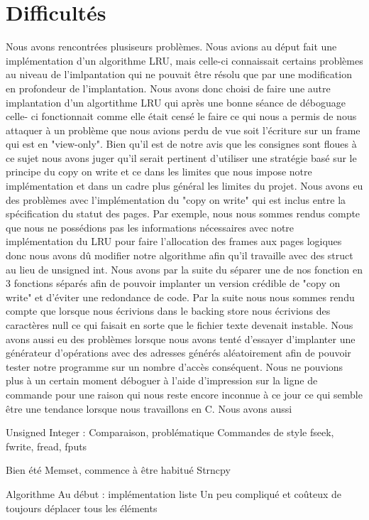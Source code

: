 \documentclass{article}
\begin{document}
\section {Difficultés}
Nous avons rencontrées plusiseurs  problèmes. Nous avions au déput fait une implémentation d'un algorithme LRU, mais celle-ci connaissait certains problèmes au niveau de l'imlpantation qui ne pouvait être résolu que par une modification en profondeur de l'implantation. Nous avons donc choisi de faire une autre implantation d'un algortithme LRU qui après une bonne séance de déboguage celle- ci fonctionnait comme elle était censé  le faire ce qui nous a permis de nous attaquer à un problème que nous avions perdu de vue soit l'écriture sur un frame qui est en "view-only". Bien qu'il est de notre avis que les consignes sont floues à ce sujet nous avons juger qu'il serait pertinent d'utiliser une stratégie basé sur le principe du copy on write et ce dans les limites que nous impose notre implémentation et dans un cadre plus général les limites du projet.  Nous avons eu des problèmes avec l'implémentation du "copy on write" qui est inclus entre la spécification du statut des pages. Par exemple, nous nous sommes rendus compte que nous ne possédions pas les informations nécessaires avec notre implémentation du LRU pour faire l'allocation des frames aux pages logiques donc nous avons dû modifier notre algorithme afin qu'il travaille avec des struct au lieu de unsigned int.  Nous avons par la suite du séparer une de nos fonction en 3 fonctions séparés afin de pouvoir implanter un version crédible de "copy on write" et d'éviter une redondance de code.  Par la suite nous nous sommes rendu compte que lorsque nous écrivions dans le backing store nous écrivions des caractères null ce qui faisait en sorte que le fichier texte devenait instable. Nous avons aussi eu des problèmes lorsque nous avons tenté d'essayer d'implanter une générateur d'opérations avec des adresses générés aléatoirement afin de pouvoir tester notre programme sur un nombre d'accès conséquent. Nous ne pouvions plus à un certain moment déboguer à l'aide d'impression sur la ligne de commande pour une raison qui nous reste encore inconnue à ce jour ce qui semble être une tendance lorsque nous travaillons en C. Nous avons aussi 


Unsigned Integer : Comparaison, problématique
Commandes de style fseek, fwrite, fread, fputs

Bien été
Memset, commence à être habitué
Strncpy

Algorithme
Au début : implémentation liste 
Un peu compliqué  et  coûteux de toujours déplacer tous les éléments
\end{document}
